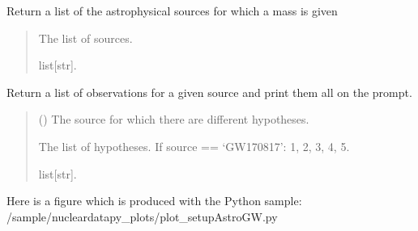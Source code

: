 \documentclass[letterpaper,10pt,english]{sphinxmanual}
\begin{document}
\begin{fulllineitems}
\label{\detokenize{source/api/setup_astro_gw:nucleardatapy.setup_astro_gw.astro_gw}}
\pysigstartsignatures
\pysiglinewithargsret
{}
{}
{}
\pysigstopsignatures
\sphinxAtStartPar
Return a list of the astrophysical sources for which a mass is given
\begin{quote}\begin{description}
\sphinxAtStartPar
The list of sources.

\sphinxAtStartPar
list{[}str{]}.

\end{description}\end{quote}

\end{fulllineitems}


\begin{fulllineitems}
\label{\detokenize{source/api/setup_astro_gw:nucleardatapy.setup_astro_gw.astro_gw_source}}
\pysigstartsignatures
\pysiglinewithargsret
{}
{}
{}
\pysigstopsignatures
\sphinxAtStartPar
Return a list of observations for a given source and print them all on the prompt.
\begin{quote}\begin{description}
\sphinxAtStartPar
{} () \textendash{} The source for which there are different hypotheses.

\sphinxAtStartPar
The list of hypotheses.     If source == ‘GW170817’: 1, 2, 3, 4, 5.

\sphinxAtStartPar
list{[}str{]}.

\end{description}\end{quote}

\end{fulllineitems}


\sphinxAtStartPar
Here is a figure which is produced with the Python sample: /sample/nucleardatapy\_plots/plot\_setupAstroGW.py
\end{document}
